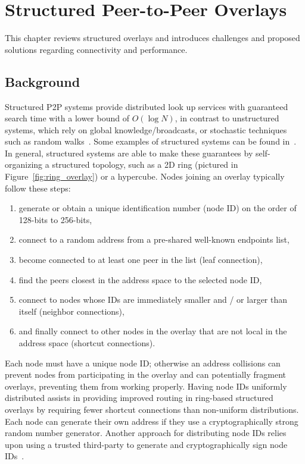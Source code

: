 \chapter{Structured Peer-to-Peer Overlays}
\label{structured_p2p}
This chapter reviews structured overlays and introduces challenges and
proposed solutions regarding connectivity and performance.

\section{Background}
Structured P2P systems provide distributed look up services with guaranteed
search time with a lower bound of $O(\log N)$, in contrast to unstructured
systems, which rely on global knowledge/broadcasts, or stochastic techniques
such as random walks~\cite{unstructured_v_structured}.  Some examples of
structured systems can be found in~\cite{pastry, chord, symphony, kademlia,
can, brunet}.  In general, structured systems are able to make these guarantees
by self-organizing a structured topology, such as a 2D ring (pictured in
Figure~\ref{fig:ring_overlay}) or a hypercube.  Nodes joining an overlay
typically follow these steps:
\begin{enumerate}
\item generate or obtain a unique identification number (node ID) on the
order of 128-bits to 256-bits,
\item connect to a random address from a pre-shared well-known endpoints list,
\item become connected to at least one peer in the list (leaf connection),
\item find the peers closest in the address space to the selected node ID,
\item connect to nodes whose IDs are immediately smaller and / or larger than
itself (neighbor connections),
\item and finally connect to other nodes in the overlay that are not local in
the address space (shortcut connections).
\end{enumerate}

Each node must have a unique node ID; otherwise an address collisions can
prevent nodes from participating in the overlay and can potentially fragment
overlays, preventing them from working properly.  Having node IDs uniformly
distributed assists in providing improved routing in ring-based structured
overlays by requiring fewer shortcut connections than non-uniform distributions.
Each node can generate their own address if they use a cryptographically strong
random number generator.  Another approach for distributing node IDs relies upon
using a trusted third-party to generate and cryptographically sign node
IDs~\cite{secure_routing}.

